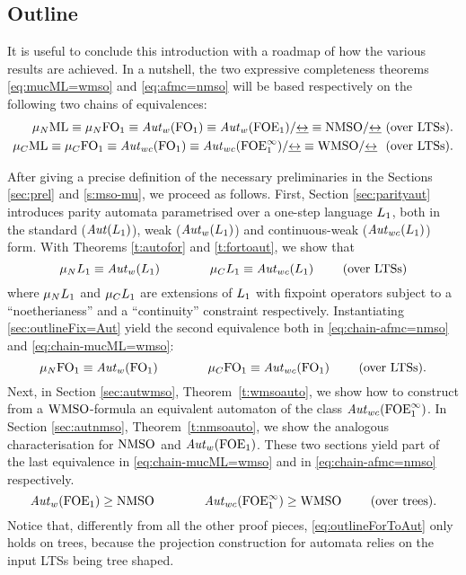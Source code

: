\subsection{Outline}

It is useful to conclude this introduction with a roadmap of how the various
results are achieved. 
In a nutshell, the two expressive completeness theorems \eqref{eq:mucML=wmso} 
and \eqref{eq:afmc=nmso} will be based respectively on the following two chains 
of equivalences:
\begin{eqnarray}
\mu_{N}\mathrm{ML} \equiv \mu_{N}\mathrm{FO}_1 \equiv \mathit{Aut}_{w}(\mathrm{FO}_1) \equiv \mathit{Aut}_{w}(\mathrm{FOE}_1)/{\mathrel{\underline{\leftrightarrow}}} \equiv \mathrm{NMSO}/{\mathrel{\underline{\leftrightarrow}}}  \ \text{(over  LTSs)}.\label{eq:chain-afmc=nmso}
\\
	\mu_{C}\mathrm{ML} \equiv \mu_{C}\mathrm{FO}_1 \equiv \mathit{Aut}_{wc}(\mathrm{FO}_1) \equiv \mathit{Aut}_{wc}(\mathrm{FOE}^{\infty}_1)/{\mathrel{\underline{\leftrightarrow}}} \equiv \mathrm{WMSO}/{\mathrel{\underline{\leftrightarrow}}}  \ \text{  (over LTSs)}. \label{eq:chain-mucML=wmso}
\end{eqnarray}

After giving a precise definition of the necessary preliminaries in 
the Sections \ref{sec:prel} and \ref{s:mso-mu}, we proceed as follows. 
First, Section \ref{sec:parityaut} introduces parity automata parametrised over 
a one-step language $L_{1}$, both in the standard ($\mathit{Aut}(L_{1})$), weak 
($\mathit{Aut}_{w}(L_{1})$) and continuous-weak ($\mathit{Aut}_{wc}(L_{1})$) form. 
With Theorems \ref{t:autofor} and \ref{t:fortoaut}, we show that
\begin{equation}\label{sec:outlineFix=Aut}
\mu_{N}L_{1}\equiv \mathit{Aut}_{w}(L_{1})  \qquad \qquad \mu_{C}L_{1} \equiv \mathit{Aut}_{wc}(L_{1})    \qquad\text{ (over LTSs)}
\end{equation}
where $\mu_{N}L_{1}$ and $\mu_{C}L_{1}$ are extensions of $L_{1}$ with fixpoint operators subject to a ``noetherianess'' and a ``continuity'' constraint respectively. Instantiating \eqref{sec:outlineFix=Aut} yield the second equivalence both in \eqref{eq:chain-afmc=nmso} and \eqref{eq:chain-mucML=wmso}:
\begin{equation*}
	 \mu_{N}\mathrm{FO}_1 \equiv \mathit{Aut}_{w}(\mathrm{FO}_1) \qquad \qquad \mu_{C}\mathrm{FO}_1 \equiv \mathit{Aut}_{wc}(\mathrm{FO}_1)  \qquad \text{ (over LTSs)}.
\end{equation*}
Next, in Section \ref{sec:autwmso}, Theorem~\ref{t:wmsoauto}, we show how to construct from a $\mathrm{WMSO}$-formula an equivalent automaton of the class $\mathit{Aut}_{wc}(\mathrm{FOE}^{\infty}_1)$. In Section \ref{sec:autnmso}, Theorem~\ref{t:nmsoauto}, we show the analogous characterisation for $\mathrm{NMSO}$ and $\mathit{Aut}_{w}(\mathrm{FOE}_1)$. These two sections yield part of the last equivalence in \eqref{eq:chain-mucML=wmso} and in \eqref{eq:chain-afmc=nmso} respectively. 
\begin{equation} \label{eq:outlineForToAut}
 \mathit{Aut}_{w}(\mathrm{FOE}_1) \geq \mathrm{NMSO} \qquad \qquad {\mathit{Aut}_{wc}(\ensuremath{\mathrm{FOE}^{\infty}_1})} \geq \mathrm{WMSO} \qquad \text{ (over trees)}.
 \end{equation}
Notice that, differently from all the other proof pieces, \eqref{eq:outlineForToAut} only holds on trees, because the projection construction for automata relies on the input LTSs being tree shaped. 


